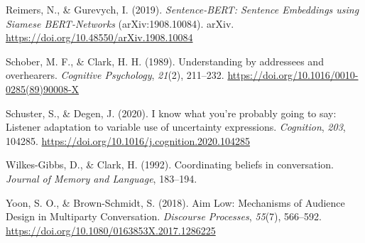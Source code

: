 \documentclass[10pt, letterpaper]{article}
\begin{document}
\begin{CSLReferences}{1}{0}
Reimers, N., \& Gurevych, I. (2019). \emph{Sentence-{BERT}: {Sentence
Embeddings} using {Siamese BERT-Networks}} (arXiv:1908.10084). arXiv.
\url{https://doi.org/10.48550/arXiv.1908.10084}

Schober, M. F., \& Clark, H. H. (1989). Understanding by addressees and
overhearers. \emph{Cognitive Psychology}, \emph{21}(2), 211--232.
\url{https://doi.org/10.1016/0010-0285(89)90008-X}

Schuster, S., \& Degen, J. (2020). I know what you're probably going to
say: {Listener} adaptation to variable use of uncertainty expressions.
\emph{Cognition}, \emph{203}, 104285.
\url{https://doi.org/10.1016/j.cognition.2020.104285}

Wilkes-Gibbs, D., \& Clark, H. (1992). Coordinating beliefs in
conversation. \emph{Journal of Memory and Language}, 183--194.

Yoon, S. O., \& Brown-Schmidt, S. (2018). Aim {Low}: {Mechanisms} of
{Audience Design} in {Multiparty Conversation}. \emph{Discourse
Processes}, \emph{55}(7), 566--592.
\url{https://doi.org/10.1080/0163853X.2017.1286225}

\end{CSLReferences}


\end{document}
